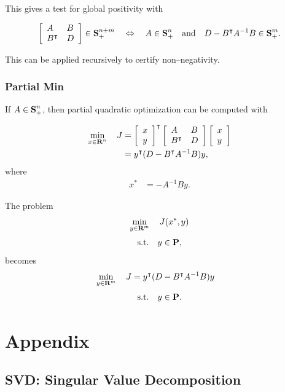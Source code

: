 \documentclass{article}
\begin{document}
    This gives a test for global positivity with

        \begin{align*}
            \left[\begin{array}{lllllllllllllllllll}A&B\\B^\intercal & D \end{array}\right] \in \textbf{S}_+^{n+m}\quad 
            \Leftrightarrow \quad A\in\textbf{S}_+^n \quad \text{and}\quad D-B^\intercal A^{-1}B\in\textbf{S}_+^m.
        \end{align*}
        
    This can be applied recursively to certify non--negativity.

\subsubsection{Partial Min}
    If $A\in\textbf{S}_+^n$, then partial quadratic optimization can be computed with

    \begin{align*}
        \min_{x\in\textbf{R}^n}\quad 
        J&=\left[\begin{array}{lllllllllllllllllll}x\\y\end{array}\right]^\intercal \left[\begin{array}{lllllllllllllllllll}A & B \\ B^\intercal & D\end{array}\right]\left[\begin{array}{lllllllllllllllllll}x\\y\end{array}\right] \\
        &=
        y^\intercal(D-B^\intercal A^{-1} B)y,
    \end{align*}
    where
    \begin{align*}
        x^*&=-A^{-1}By.
    \end{align*}

    The problem
    \begin{align*}
        \min_{y\in\textbf{R}^m}\quad 
        J(x^*,y)
    \end{align*}
    \begin{align*}
        \text{s.t.}\quad y\in\textbf{P},
    \end{align*}
    becomes
    \begin{align*}
        \min_{y\in\textbf{R}^m}\quad 
        J&=y^\intercal(D-B^\intercal A^{-1} B)y
    \end{align*}
    \begin{align*}
        \text{s.t.}\quad y\in\textbf{P}.
    \end{align*}

\clearpage

\section{Appendix}

\subsection{SVD: Singular Value Decomposition}
\end{document}
